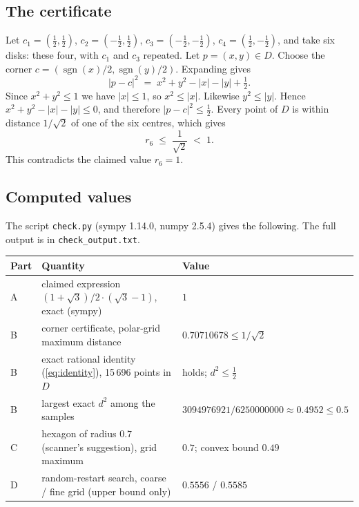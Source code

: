\documentclass[11pt]{article}
\theoremstyle{definition}
\theoremstyle{plain}
\begin{document}
\subsection{The certificate}

Let $c_1=(\tfrac12,\tfrac12)$, $c_2=(-\tfrac12,\tfrac12)$, $c_3=(-\tfrac12,-\tfrac12)$, $c_4=(\tfrac12,-\tfrac12)$, and take six disks: these four, with $c_1$ and $c_3$ repeated. Let $p=(x,y)\in D$. Choose the corner $c=(\operatorname{sgn}(x)/2,\operatorname{sgn}(y)/2)$. Expanding gives
\begin{equation}\label{eq:identity}
  |p-c|^2 \;=\; x^2+y^2-|x|-|y|+\tfrac12 .
\end{equation}
Since $x^2+y^2\le 1$ we have $|x|\le 1$, so $x^2\le |x|$. Likewise $y^2\le |y|$. Hence $x^2+y^2-|x|-|y|\le 0$, and therefore $|p-c|^2\le \tfrac12$. Every point of $D$ is within distance $1/\sqrt2$ of one of the six centres, which gives
\[
  r_6 \;\le\; \frac{1}{\sqrt 2} \;<\; 1 .
\]
This contradicts the claimed value $r_6 = 1$.

\subsection{Computed values}

The script \texttt{check.py} (sympy 1.14.0, numpy 2.5.4) gives the following. The full output is in \texttt{check\_output.txt}.

{\small\begin{center}
\begin{tabular}{@{}lll@{}}
\hline
Part & Quantity & Value \\
\hline
A & claimed expression $(1+\sqrt3)/2\cdot(\sqrt3-1)$, exact (sympy) & $1$ \\
B & corner certificate, polar-grid maximum distance & $0.70710678 \le 1/\sqrt2$ \\
B & exact rational identity (\ref{eq:identity}), 15\,696 points in $D$ & holds; $d^2\le\tfrac12$ \\
B & largest exact $d^2$ among the samples & $3094976921/6250000000 \approx 0.4952 \le 0.5$ \\
C & hexagon of radius $0.7$ (scanner's suggestion), grid maximum & $0.7$; convex bound $0.49$ \\
D & random-restart search, coarse / fine grid (upper bound only) & $0.5556$ / $0.5585$ \\
\hline
\end{tabular}
\end{center}}
\end{document}
